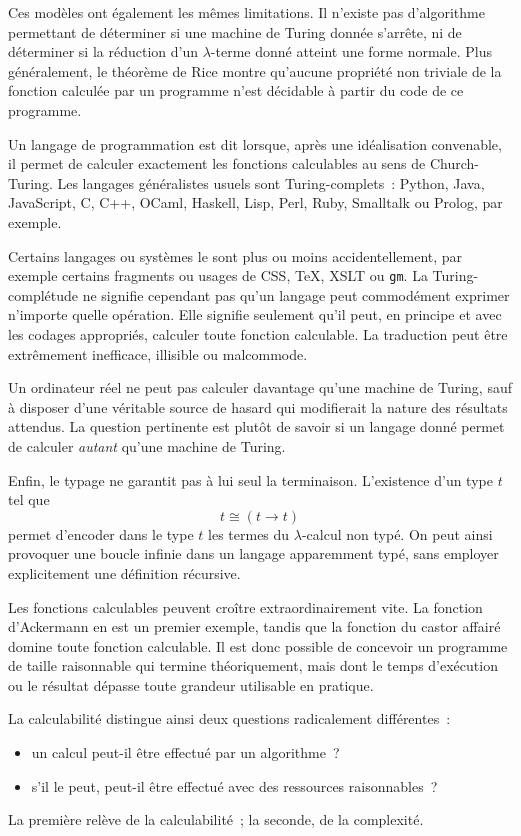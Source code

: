 \thingy Ces modèles ont également les mêmes limitations.  Il n'existe
pas d'algorithme permettant de déterminer si une machine de Turing
donnée s'arrête, ni de déterminer si la réduction d'un
$\lambda$-terme donné atteint une forme normale.  Plus généralement,
le théorème de Rice montre qu'aucune propriété non triviale de la
fonction calculée par un programme n'est décidable à partir du code de
ce programme.

\thingy Un langage de programmation est dit
 lorsque, après une
idéalisation convenable, il permet de calculer exactement les fonctions
calculables au sens de Church-Turing.  Les langages généralistes usuels
sont Turing-complets : Python, Java, JavaScript, C, C++, OCaml, Haskell,
Lisp, Perl, Ruby, Smalltalk ou Prolog, par exemple.

Certains langages ou systèmes le sont plus ou moins accidentellement,
par exemple certains fragments ou usages de CSS, \TeX, XSLT ou
\texttt{gm}.  La Turing-complétude ne signifie cependant pas qu'un
langage peut commodément exprimer n'importe quelle opération.  Elle
signifie seulement qu'il peut, en principe et avec les codages
appropriés, calculer toute fonction calculable.  La traduction peut
être extrêmement inefficace, illisible ou malcommode.

Un ordinateur réel ne peut pas calculer davantage qu'une machine de
Turing, sauf à disposer d'une véritable source de hasard qui modifierait
la nature des résultats attendus.  La question pertinente est plutôt
de savoir si un langage donné permet de calculer \emph{autant} qu'une
machine de Turing.

\thingy Enfin, le typage ne garantit pas à lui seul la terminaison.
L'existence d'un type $t$ tel que
\[
t\cong(t\to t)
\]
permet d'encoder dans le type $t$ les termes du $\lambda$-calcul non
typé.  On peut ainsi provoquer une boucle infinie dans un langage
apparemment typé, sans employer explicitement une définition
récursive.


\thingy Les fonctions calculables peuvent croître extraordinairement
vite.  La fonction d'Ackermann en est un premier exemple, tandis que la
fonction du castor affairé domine toute fonction calculable.  Il est
donc possible de concevoir un programme de taille raisonnable qui
termine théoriquement, mais dont le temps d'exécution ou le résultat
dépasse toute grandeur utilisable en pratique.

La calculabilité distingue ainsi deux questions radicalement
différentes :
\begin{itemize}
\item un calcul peut-il être effectué par un algorithme ?
\item s'il le peut, peut-il être effectué avec des ressources
  raisonnables ?
\end{itemize}
La première relève de la calculabilité ; la seconde, de la complexité.
